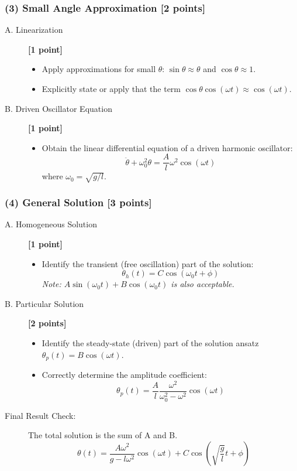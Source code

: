 \documentclass[11pt, a4paper]{article} %
\begin{document}
\subsubsection*{(3) Small Angle Approximation [2 points]}
\begin{description}
    \item[A. Linearization] \hfill \textbf{[1 point]}
    \begin{itemize}
        \item Apply approximations for small $\theta$: $\sin\theta \approx \theta$ and $\cos\theta \approx 1$.
        \item Explicitly state or apply that the term $\cos\theta \cos(\omega t) \approx \cos(\omega t)$.
    \end{itemize}
    \item[B. Driven Oscillator Equation] \hfill \textbf{[1 point]}
    \begin{itemize}
        \item Obtain the linear differential equation of a driven harmonic oscillator:
        $$ \ddot{\theta} + \omega_0^2 \theta = \frac{A}{l}\omega^2 \cos(\omega t) $$
        where $\omega_0 = \sqrt{g/l}$.
    \end{itemize}
\end{description}

\subsubsection*{(4) General Solution [3 points]}
\begin{description}
    \item[A. Homogeneous Solution] \hfill \textbf{[1 point]}
    \begin{itemize}
        \item Identify the transient (free oscillation) part of the solution:
        $$ \theta_h(t) = C \cos(\omega_0 t + \phi) $$
        \textit{Note: $A\sin(\omega_0 t) + B\cos(\omega_0 t)$ is also acceptable.}
    \end{itemize}
    \item[B. Particular Solution] \hfill \textbf{[2 points]}
    \begin{itemize}
        \item Identify the steady-state (driven) part of the solution ansatz $\theta_p(t) = B \cos(\omega t)$.
        \item Correctly determine the amplitude coefficient:
        $$ \theta_p(t) = \frac{A}{l} \frac{\omega^2}{\omega_0^2 - \omega^2} \cos(\omega t) $$
    \end{itemize}
    \item[Final Result Check:] The total solution is the sum of A and B.
    $$ \theta(t) = \frac{A \omega^2}{g - l\omega^2} \cos(\omega t) + C \cos\left(\sqrt{\frac{g}{l}}t + \phi\right) $$
\end{description}
\end{document}
